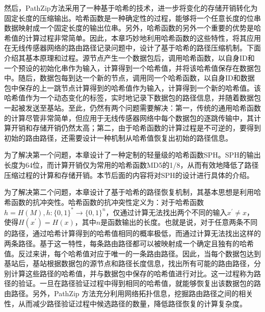 然后，PathZip方法采用了一种基于哈希的技术，进一步将变化的存储开销转化为固定长度的压缩输出。哈希函数是一种确定性的过程，能够将一个任意长度的位串数据映射成一个固定长度的输出位串。另外，哈希函数的另外一个重要的优势是哈希值的计算过程非常简单。因此，本章巧妙地利用哈希函数的这些特性，将其应用在无线传感器网络的路由路径记录问题中，设计了基于哈希的路径压缩机制。下面介绍其基本原理和过程。源节点产生一个数据包后，调用哈希函数，以自身ID和一个预设的初始化串作为输入，计算得到一个哈希值，并将该哈希值保存在数据包中。随后，数据包每到达一个新的节点，调用同一个哈希函数，以自身ID和数据包中保存的上一跳节点计算得到的哈希值作为输入，计算得到一个新的哈希值。该哈希值作为一个动态变化的标签，实时地记录下数据包的路径信息，并随着数据包一起被发送至基站。至此，仍然有两个问题需要解决：第一，传统的通用哈希函数的计算尽管非常简单，但应用于无线传感器网络中每个数据包的逐跳传输中，其计算开销和存储开销仍然太高；第二，由于哈希函数的计算过程是不可逆的，要得到初始的路由路径，还需要设计一种机制从哈希值恢复出初始的路径信息。

为了解决第一个问题，本章设计了一种定制的轻量级的哈希函数SPH。SPH的输出长度为64位，而计算开销仅为常用的哈希函数MD5的1/8，从而有效地降低了路径压缩过程的计算和存储开销。本节后面的内容将对SPH的设计进行具体的介绍。

为了解决第二个问题，本章设计了基于哈希的路径恢复机制，其基本思想是利用哈希函数的抗冲突性。哈希函数的抗冲突性定义为：对于哈希函数$h=H(M), h:{\{0,1\}}^{*}\to{\{0,1\}}^n$，仅通过计算无法找出两个不同的输入$x^{'}\neq{x}$，使得$H(x^{'})=H(x)$，其中$n$是函数输出的长度。也就是说，对于任意两条不同的路径，通过哈希计算得到的哈希值相同的概率极低，而通过计算无法找出这样的两条路径。基于这一特性，每条路由路径都可以被映射成一个确定且独有的哈希值。反过来讲，每个哈希值对应于唯一的一条路由路径。因此，当每个数据包达到基站后，基站根据数据包的源节点和路径长度信息，找出所有可能的路由路径，分别计算这些路径的哈希值，并与数据包中保存的哈希值进行对比。这一过程称为路径的验证。一旦在路径验证过程中得到相同的哈希值，就能够恢复出该数据包的路由路径。另外，PathZip 方法充分利用网络拓扑信息，挖掘路由路径之间的相关性，从而减少路径验证过程中候选路径的数量，降低路径恢复的计算复杂度。

